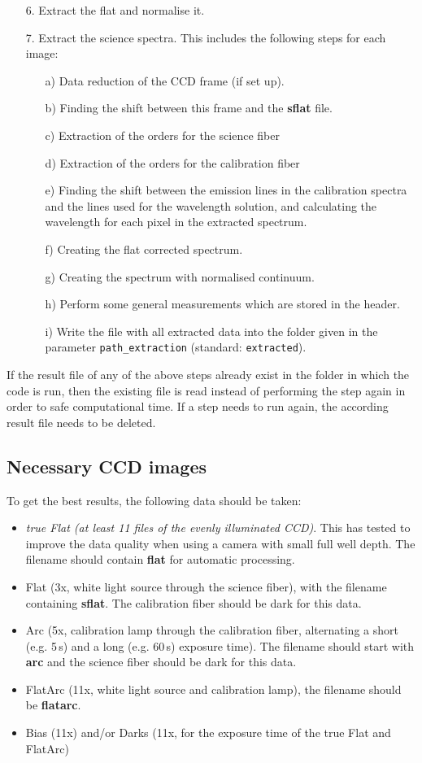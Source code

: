 \documentclass[10pt,a4paper]{article}
\begin{document}
\begin{itemize}
  \item[6.] Extract the flat and normalise it.
  \item[7.] Extract the science spectra. This includes the following steps for each image:
  \begin{itemize}
    \item[a)] Data reduction of the CCD frame (if set up).
    \item[b)] Finding the shift between this frame and the \textbf{sflat} file.
    \item[c)] Extraction of the orders for the science fiber
    \item[d)] Extraction of the orders for the calibration fiber
    \item[e)] Finding the shift between the emission lines in the calibration spectra and the lines used for the wavelength solution, and calculating the wavelength for each pixel in the extracted spectrum.
    \item[f)] Creating the flat corrected spectrum.
    \item[g)] Creating the spectrum with normalised continuum.
    \item[h)] Perform some general measurements which are stored in the header.
    \item[i)] Write the file with all extracted data into the folder given in the parameter \verb|path_extraction| (standard: \verb|extracted|).
  \end{itemize}
\end{itemize}

\noindent If the result file of any of the above steps already exist in the folder in which the code is run, then the existing file is read instead of performing the step again in order to safe computational time. If a step needs to run again, the according result file needs to be deleted.

\subsection{Necessary CCD images}
To get the best results, the following data should be taken:
\begin{itemize}
  \item \textit{true Flat (at least 11 files of the evenly illuminated CCD)}. This has tested to improve the data quality when using a camera with small full well depth. The filename should contain \textbf{flat} for automatic processing.
  \item Flat (3x, white light source through the science fiber), with the filename containing \textbf{sflat}. The calibration fiber should be dark for this data.
  \item Arc (5x, calibration lamp through the calibration fiber, alternating a short (e.g. 5\,s) and a long (e.g. 60\,s) exposure time). The filename should start with \textbf{arc} and the science fiber should be dark for this data.
  \item FlatArc (11x, white light source and calibration lamp), the filename should be \textbf{flatarc}.
  \item Bias (11x) and/or Darks (11x, for the exposure time of the true Flat and FlatArc)
\end{itemize}
\end{document}
